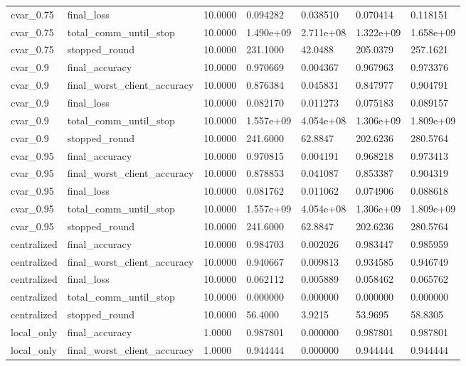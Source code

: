 \documentclass[11pt]{report}
\begin{document}
\begin{longtable}{lllllll}
cvar\_0.75 & final\_loss & 10.0000 & 0.094282 & 0.038510 & 0.070414 & 0.118151 \\
cvar\_0.75 & total\_comm\_until\_stop & 10.0000 & 1.490e+09 & 2.711e+08 & 1.322e+09 & 1.658e+09 \\
cvar\_0.75 & stopped\_round & 10.0000 & 231.1000 & 42.0488 & 205.0379 & 257.1621 \\
cvar\_0.9 & final\_accuracy & 10.0000 & 0.970669 & 0.004367 & 0.967963 & 0.973376 \\
cvar\_0.9 & final\_worst\_client\_accuracy & 10.0000 & 0.876384 & 0.045831 & 0.847977 & 0.904791 \\
cvar\_0.9 & final\_loss & 10.0000 & 0.082170 & 0.011273 & 0.075183 & 0.089157 \\
cvar\_0.9 & total\_comm\_until\_stop & 10.0000 & 1.557e+09 & 4.054e+08 & 1.306e+09 & 1.809e+09 \\
cvar\_0.9 & stopped\_round & 10.0000 & 241.6000 & 62.8847 & 202.6236 & 280.5764 \\
cvar\_0.95 & final\_accuracy & 10.0000 & 0.970815 & 0.004191 & 0.968218 & 0.973413 \\
cvar\_0.95 & final\_worst\_client\_accuracy & 10.0000 & 0.878853 & 0.041087 & 0.853387 & 0.904319 \\
cvar\_0.95 & final\_loss & 10.0000 & 0.081762 & 0.011062 & 0.074906 & 0.088618 \\
cvar\_0.95 & total\_comm\_until\_stop & 10.0000 & 1.557e+09 & 4.054e+08 & 1.306e+09 & 1.809e+09 \\
cvar\_0.95 & stopped\_round & 10.0000 & 241.6000 & 62.8847 & 202.6236 & 280.5764 \\
centralized & final\_accuracy & 10.0000 & 0.984703 & 0.002026 & 0.983447 & 0.985959 \\
centralized & final\_worst\_client\_accuracy & 10.0000 & 0.940667 & 0.009813 & 0.934585 & 0.946749 \\
centralized & final\_loss & 10.0000 & 0.062112 & 0.005889 & 0.058462 & 0.065762 \\
centralized & total\_comm\_until\_stop & 10.0000 & 0.000000 & 0.000000 & 0.000000 & 0.000000 \\
centralized & stopped\_round & 10.0000 & 56.4000 & 3.9215 & 53.9695 & 58.8305 \\
local\_only & final\_accuracy & 1.0000 & 0.987801 & 0.000000 & 0.987801 & 0.987801 \\
local\_only & final\_worst\_client\_accuracy & 1.0000 & 0.944444 & 0.000000 & 0.944444 & 0.944444 \\

\end{longtable}
\end{document}
